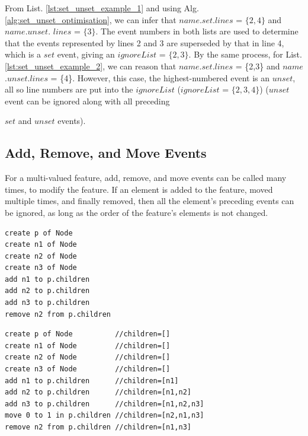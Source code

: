 \documentclass{llncs}
\begin{document}
From List. \ref{lst:set_unset_example_1} and using Alg. \ref{alg:set_unset_optimisation}, we can infer that $name$.$set$.$lines$ = $\{2,4\}$ and $name$.$unset$. $lines$ = $\{3\}$. The event numbers in both lists are used to determine that the events represented by lines 2 and 3 are superseded by that in line 4, which is a $set$ event, giving an $ignoreList$ = $\{2, 3\}$. By the same process, for List. \ref{lst:set_unset_example_2}, we can reason that $name$.$set$.$lines$ = \{2,3\} and $name$.$unset$.$lines$ = \{4\}.  However, this case, the highest-numbered event is an $unset$, all so line numbers are put into the $ignoreList$ ($ignoreList$ = $\{2, 3, 4\}$) ($unset$ event can be ignored along with all preceding {$set$ and $unset$ events). 


\vspace{-15pt}
\subsection{Add, Remove, and Move Events}\label{subsec:add_remove_and_move_operations}

\vspace{-10pt}
For a multi-valued feature, add, remove, and move events can be called many times, to modify the feature. If an element is added to the feature, moved multiple times, and finally removed, then all the element's preceding events can be ignored, as long as the order of the feature's elements is not changed. 

\vspace{-20pt}
\begin{minipage}[t]{0.34\linewidth}
\begin{lstlisting}[style=eol,caption={A CBP of add and remove operations.},label=lst:add_move_reference]
create p of Node
create n1 of Node
create n2 of Node
create n3 of Node
add n1 to p.children
add n2 to p.children
add n3 to p.children
remove n2 from p.children   
\end{lstlisting}
\end{minipage}
\hfill
\begin{minipage}[t]{0.62\linewidth}
\begin{lstlisting}[style=eol,caption={A CBP representation of add, move, and remove operations.},label=lst:add_remove_move_reference]
create p of Node          //children=[]
create n1 of Node         //children=[]
create n2 of Node         //children=[]
create n3 of Node         //children=[]
add n1 to p.children      //children=[n1]
add n2 to p.children      //children=[n1,n2]
add n3 to p.children      //children=[n1,n2,n3]
move 0 to 1 in p.children //children=[n2,n1,n3]
remove n2 from p.children //children=[n1,n3]
\end{lstlisting}
\end{minipage}

}
\end{document}
